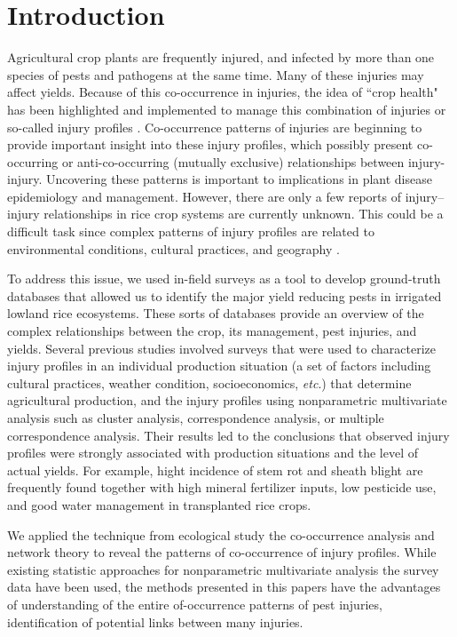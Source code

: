 \section{Introduction}
Agricultural crop plants are frequently injured, and infected by more than one species of pests and pathogens at the same time. Many of these injuries may affect yields. Because of this co-occurrence in injuries, the idea of ``crop health" has been highlighted and implemented to manage this combination of injuries or so-called injury profiles \citep{Savary_2006}. Co-occurrence patterns of injuries are beginning to provide important insight into these injury profiles, which possibly present co-occurring or anti-co-occurring (mutually exclusive) relationships between injury-injury. Uncovering these patterns is important to implications in plant disease epidemiology and management. However, there are only a few reports of injury–injury relationships in rice crop systems are currently unknown. This could be a difficult task since complex patterns of injury profiles are related to environmental conditions, cultural practices, and geography \citep{Willocquet_2008_Simulating}.

To address this issue, we used in-field surveys as a tool to develop ground-truth databases that allowed us to identify the major yield reducing pests in irrigated lowland rice ecosystems. These sorts of databases provide an overview of the complex relationships between the crop, its management, pest injuries, and yields. Several previous studies \cite{Savary_2000_Characterization, Savary_2000_Quantification, Dong_2010_Characterization,Reddy_2011_Characterizing} involved surveys that were used to characterize injury profiles in an individual production situation (a set of factors including cultural practices, weather condition, socioeconomics, \textit{etc}.) that determine agricultural production, and the injury profiles using nonparametric multivariate analysis such as cluster analysis, correspondence analysis, or multiple correspondence analysis. Their results led to the conclusions that observed injury profiles were strongly associated with production situations and the level of actual yields. For example, hight incidence of stem rot and sheath blight are frequently found together with high mineral fertilizer inputs, low pesticide use, and good water management in transplanted rice crops.

We applied the technique from ecological study the co-occurrence analysis and network theory to reveal the patterns of co-occurrence of injury profiles. While existing statistic approaches for nonparametric multivariate analysis the survey data have been used, the methods presented in this papers have the advantages of understanding of the entire of-occurrence patterns of pest injuries, identification of potential links between many injuries. 

